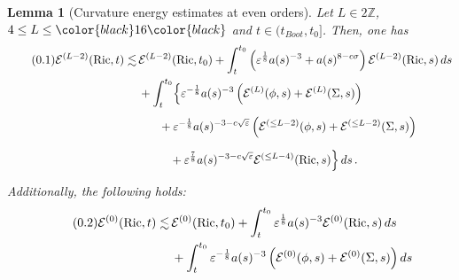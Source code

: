\documentclass[11pt,leqno,textwidth=10cm]{amsart}
\numberwithin{equation}{section}
\theoremstyle{definition}
\theoremstyle{plain}
\newtheorem{lemma}[definition]{Lemma}
\newcommand{\1}{\mathbbm{1}}
\newcommand{\E}{\mathcal{E}}
\newcommand{\Ric}{\text{\normalfont{Ric}}}
\newcommand{\Z}{\mathbb{Z}}
\renewcommand{\epsilon}{\varepsilon}
\newcommand{\numberthis}{\addtocounter{equation}{1}\tag{\theequation}}
\renewcommand{\theequation}{\arabic{section}.\arabic{equation}}
\newcommand{\change}[1]{\color{black}#1\color{black}}
\begin{document}
\begin{lemma}[Curvature energy estimates \change{at even orders}]\label{lem:en-est-Ric}
Let $L\in 2\Z$, $4\leq L\leq \change{16}$ and $t\in(t_{Boot},t_0]$. Then, one has
\begin{align*}
\numberthis\label{eq:en-est-Ric}\E^{(L-2)}(\Ric,t)\lesssim&\,\E^{(L-2)}(\Ric,t_0)+\int_t^{t_0}\left(\epsilon^\frac18a(s)^{-3}+a(s)^{8-c\sigma}\right)\E^{(L-2)}(\Ric,s)\,ds\\
&\,+\int_t^{t_0}\Bigr\{\epsilon^{-\frac18}a(s)^{-3}\left(\E^{(L)}(\phi,s)+\E^{(L)}(\Sigma,s)\right)\\
&\,\phantom{\int_t^{t_0}}+\epsilon^{-\frac18}a(s)^{-3-c\sqrt{\epsilon}}\left(\E^{(\leq L-2)}(\phi,s)+\E^{(\leq L-2)}(\Sigma,s)\right)\\
&\,\phantom{+\int_t^{t_0}}+\epsilon^\frac78a(s)^{-3-c\sqrt{\epsilon}}\E^{(\leq L-4)}(\Ric,s)\Bigr\}\,ds\,.
\end{align*}
Additionally, the following holds:
\begin{align*}
\numberthis\label{eq:en-est-Ric0}\E^{(0)}(\Ric,t)\lesssim&\,\E^{(0)}(\Ric,t_0)+\int_t^{t_0}\epsilon^\frac18a(s)^{-3}\E^{(0)}(\Ric,s)\,ds\\
&\,+\int_t^{t_0}\epsilon^{-\frac18}a(s)^{-3}\left(\E^{(0)}(\phi,s)+\E^{(0)}(\Sigma,s)\right)ds
\end{align*}
\end{lemma}
\end{document}
